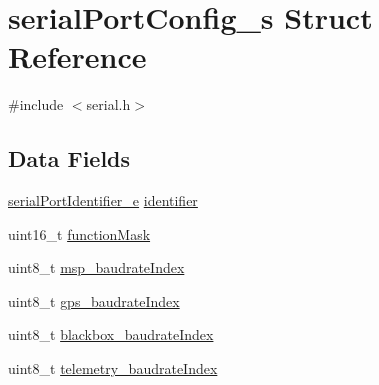 \hypertarget{structserialPortConfig__s}{\section{serial\+Port\+Config\+\_\+s Struct Reference}
\label{structserialPortConfig__s}
}


{\ttfamily \#include $<$serial.\+h$>$}

\subsection*{Data Fields}
\begin{DoxyCompactItemize}
\item 
\hyperlink{config_2serial_8h_a5aaf3d2a774f7a0335773299b8d78182}{serial\+Port\+Identifier\+\_\+e} \hyperlink{structserialPortConfig__s_ad1e75fc469c17b83e1a92def85addcb3}{identifier}
\item 
uint16\+\_\+t \hyperlink{structserialPortConfig__s_a1fb6ee72e0d5215e7b08ff5ae1b3b477}{function\+Mask}
\item 
uint8\+\_\+t \hyperlink{structserialPortConfig__s_ad904e0230d906d2b7371f036e43e887f}{msp\+\_\+baudrate\+Index}
\item 
uint8\+\_\+t \hyperlink{structserialPortConfig__s_a1c99bc2afd18c5eebad32ff22a8aec5f}{gps\+\_\+baudrate\+Index}
\item 
uint8\+\_\+t \hyperlink{structserialPortConfig__s_a2b2e51d404059054eab57d2183725783}{blackbox\+\_\+baudrate\+Index}
\item 
uint8\+\_\+t \hyperlink{structserialPortConfig__s_a923fd7b551abb5a75968b5fa03074386}{telemetry\+\_\+baudrate\+Index}
\end{DoxyCompactItemize}


